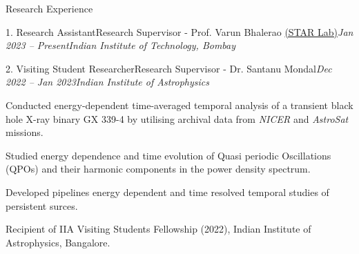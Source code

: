 \begin{section}{Research Experience}
\begin{subsection}{1. Research Assistant}{Research Supervisor - Prof. Varun Bhalerao \href{https://www.star-iitb.in/home}{(STAR Lab)}}{\textit{Jan 2023 -- Present}}{\textit{Indian Institute of Technology, Bombay}}
    \end{subsection}
\vspace{-0.1em}
    \begin{subsection}{2. Visiting Student Researcher}{Research Supervisor - Dr. Santanu Mondal}{\textit{Dec 2022 -- Jan 2023}}{\textit{Indian Institute of Astrophysics}}
        \vspace{0.5em}
        \item Conducted energy-dependent time-averaged temporal analysis of a transient black hole X-ray binary GX 339-4 by utilising archival data from \textit{NICER} and \textit{AstroSat} missions.
        \item Studied energy dependence and time evolution of Quasi periodic Oscillations (QPOs) and their harmonic components in the power density spectrum. 
        \item Developed pipelines energy dependent and time resolved temporal studies of persistent surces. 
        \item Recipient of IIA Visiting Students Fellowship (2022), Indian Institute of Astrophysics, Bangalore.
    \end{subsection}
\end{section}
